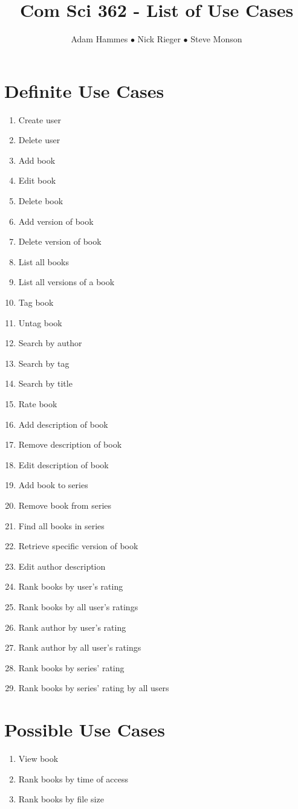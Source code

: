 \documentclass[11pt]{article}
\title{Com Sci 362 - List of Use Cases}
\author{Adam Hammes $\bullet$ Nick Rieger $\bullet$ Steve Monson}
\begin{document}
\maketitle


\section*{Definite Use Cases}

\begin{enumerate}[(1)]
    \item Create user
    \item Delete user
    \item Add book
    \item Edit book
    \item Delete book
    \item Add version of book
    \item Delete version of book
    \item List all books
    \item List all versions of a book
    \item Tag book
    \item Untag book
    \item Search by author
    \item Search by tag
    \item Search by title
    \item Rate book
    \item Add description of book
    \item Remove description of book
    \item Edit description of book
    \item Add book to series
    \item Remove book from series
    \item Find all books in series
    \item Retrieve specific version of book
    \item Edit author description
    \item Rank books by user's rating
    \item Rank books by all user's ratings
    \item Rank author by user's rating
    \item Rank author by all user's ratings
    \item Rank books by series' rating
    \item Rank books by series' rating by all users
\end{enumerate}


\section*{Possible Use Cases}

\begin{enumerate}[(1)]
    \item View book
    \item Rank books by time of access
    \item Rank books by file size
\end{enumerate}
\end{document}
